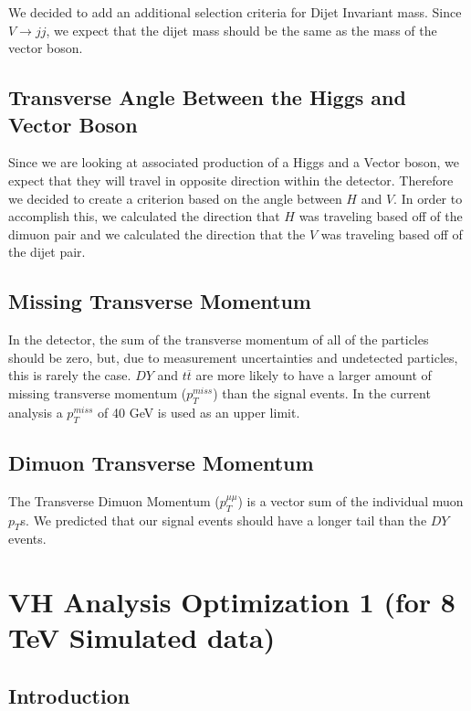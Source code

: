 \documentclass[12pt]{article}
\begin{document}
We decided to add an additional selection criteria for Dijet Invariant mass. 
Since $V \rightarrow jj$, we expect that the dijet mass should be the same as the mass of the vector boson.

\subsection{Transverse Angle Between the Higgs and Vector Boson}

Since we are looking at associated production of a Higgs and a Vector boson, we expect that they will travel in opposite direction within the detector. 
Therefore we decided to create a criterion based on the angle between $H$ and $V$. 
In order to accomplish this, we calculated the direction that $H$ was traveling based off of the dimuon pair 
and we calculated the direction that the $V$ was traveling based off of the dijet pair. 

\subsection{Missing Transverse Momentum}

In the detector, the sum of the transverse momentum of all of the particles should be zero, 
but, due to measurement uncertainties and undetected particles, this is rarely the case. 
$DY$ and $t\overline{t}$ are more likely to have a larger amount of missing transverse momentum ($p_{T}^{miss}$) than the signal events. 
In the current analysis a $p_{T}^{miss}$ of 40 GeV is used as an upper limit.

\subsection{Dimuon Transverse Momentum}

The Transverse Dimuon Momentum ($p_{T}^{\mu \mu}$) is a vector sum of the individual muon $p_{T}$s. 
We predicted that our signal events should have a longer tail than the $DY$ events.

\section{VH Analysis Optimization 1 (for 8 TeV Simulated data)}

\subsection{Introduction}
\end{document}
